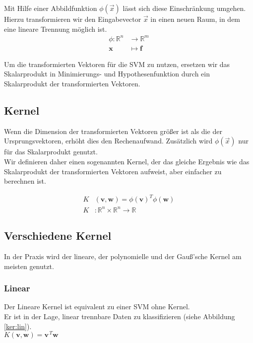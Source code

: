 \documentclass[10pt,a4paper]{scrartcl}
\begin{document}
                Mit Hilfe einer Abbildfunktion $\phi(\vec{x})$ lässt sich diese Einschränkung umgehen. Hierzu transformieren wir den Eingabevector $\vec{x}$ in einen neuen Raum, in dem eine lineare Trennung möglich ist. \\
                
                \begin{align*}
                    \phi: \mathbb{R}^{n} & \to \mathbb{R}^{m} \\
                    \boldsymbol{x} & \mapsto \boldsymbol{f}
                \end{align*}
                
                Um die transformierten Vektoren für die SVM zu nutzen, ersetzen wir das Skalarprodukt in Minimierungs- und Hypothesenfunktion durch ein Skalarprodukt der transformierten Vektoren. \\
                
            \subsection{Kernel}
                Wenn die Dimension der transformierten Vektoren größer ist als die der Ursprungsvektoren, erhöht dies den Rechenaufwand.
                Zusätzlich wird $\phi(\vec{x})$ nur für das Skalarprodukt genutzt. \\
                
                Wir definieren daher einen sogenannten Kernel, der das gleiche Ergebnis wie das Skalarprodukt der transformierten Vektoren aufweist, aber einfacher zu berechnen ist.
                
                \begin{align*}
                    K&(\boldsymbol{v}, \boldsymbol{w}) = \phi(\boldsymbol{v})^{T} \phi(\boldsymbol{w})\\
                    K&: \mathbb{R}^n \times \mathbb{R}^n \rightarrow \mathbb{R}
                \end{align*}
                
            \subsection{Verschiedene Kernel}
                In der Praxis wird der lineare, der polynomielle und der Gauß'sche Kernel am meisten genutzt.
                \subsubsection{Linear}
                    Der Lineare Kernel ist equivalent zu einer SVM ohne Kernel. \\
                    Er ist in der Lage, linear trennbare Daten zu klassifizieren (siehe Abbildung \ref{ker:lin}). \\
                    $K(\boldsymbol{v}, \boldsymbol{w}) = \boldsymbol{v}^{\, T} \boldsymbol{w}$
                
\end{document}
